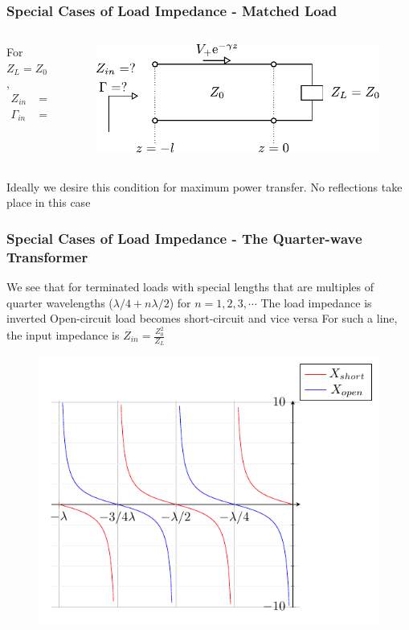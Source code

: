\documentclass[10pt, compress]{beamer}
\begin{document}
\begin{frame}
  \frametitle{Special Cases of Load Impedance - Matched Load}
  \begin{columns}[T] %
    \begin{column}{.3\textwidth}
      For $Z_L = Z_0$,
      \begin{align*}
        Z_{in} &=   Z_0  \\
        \Gamma_{in} &= 0 
      \end{align*}
     \end{column}
   \begin{column}[T]{.7\textwidth}
    \begin{figure}[T!]
      \centering
      \includegraphics[width=.9\textwidth]{tline_matched.pdf}
      \end{figure}
        \end{column}%
  \end{columns}
  \begin{outline}
    \1 Ideally we desire this condition for maximum power transfer.
    \1 No reflections take place in this case
  \end{outline}
\end{frame}

\begin{frame}
  \frametitle{Special Cases of Load Impedance - The Quarter-wave Transformer}
    \begin{outline}
    \1 We see that for terminated loads with special lengths that are multiples of quarter wavelengths ($\lambda/4 + n \lambda/2$) for $n = 1,2,3, \cdots$
    \1 The load impedance is inverted
      \2 Open-circuit load becomes short-circuit and vice versa
    \1 For such a line, the input impedance is $Z_{in} = \frac{Z_0^2}{Z_L}$
  \end{outline}
  \begin{figure}[h!]
    \centering
    \includegraphics[width=.6\textwidth]{invert_impedance.pdf}         
  \end{figure}
\end{frame}
\end{document}

